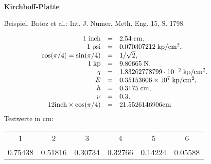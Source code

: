 \documentclass[12pt,a4paper]{article}
\begin{document}
%
\addtolength{\abovedisplayskip}{-1ex}
\addtolength{\belowdisplayskip}{-1ex}
\addtolength{\abovedisplayshortskip}{-1ex}
\addtolength{\belowdisplayshortskip}{-1ex}
%
%
\bc
{\bf Kirchhoff-Platte}
\ec
{\large
Beispiel. Batoz et al.: Int. J. Numer. Meth. Eng. 15, S. 1798
\par
\[ \ba{.}{rcl}
1 \; \mbox{inch} &=& 2.54 \; \mbox{cm},\\
1 \; \mbox{psi} &=& 0.070307212 \; \mbox{kp$/$cm$^2$},\\
\cos (\pi/4) = \sin (\pi/4) &=& 1/\sqrt{2},\\
1 \; \mbox{kp} &=& 9.80665 \; \mbox{N},\\
q &=& 1.832 627 787 99\cdot 10^{-2} \; \mbox{kp/cm$^{2}$},\\
E &=& 0.35153606\times 10^7 \; \mbox{kp/cm$^2$},\\
h &=& 0.3175 \; \mbox{cm},\\
\nu &=&  0.3,\\
12 \mbox{inch}\times \cos(\pi/4) &=& 21.5526146906 \mbox{cm}\\
\ea{.}
\]
Testwerte in cm:
\par
\begin{tabular}{cccccc}
1 & 2 & 3 & 4 & 5 & 6\\
0.75438 & 0.51816 & 0.30734 & 0.32766 & 0.14224 & 0.05588
\end{tabular}
\par
}
\end{document}
